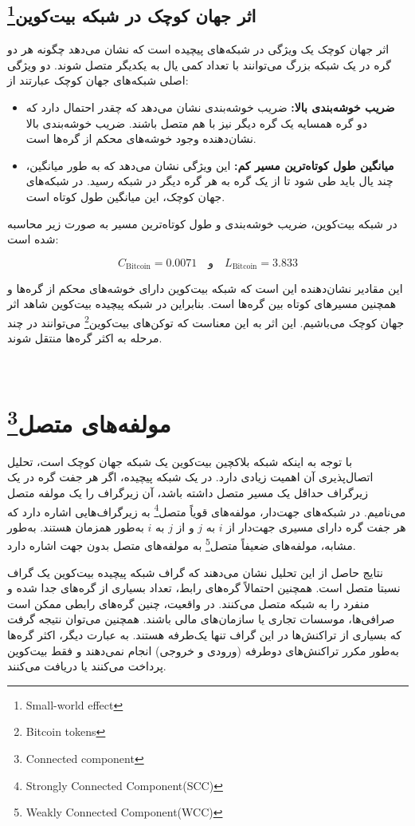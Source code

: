 \subsection{اثر جهان کوچک در شبکه بیت‌کوین\footnote{Small-world effect}}

اثر جهان کوچک یک ویژگی در شبکه‌های پیچیده است که نشان می‌دهد چگونه هر دو گره در یک شبکه بزرگ می‌توانند با تعداد کمی یال به یکدیگر متصل شوند. دو ویژگی اصلی شبکه‌های جهان کوچک عبارتند از:

\begin{itemize}
    \item \textbf{ضریب خوشه‌بندی بالا:} ضریب خوشه‌بندی نشان می‌دهد که چقدر احتمال دارد که دو گره همسایه یک گره دیگر نیز با هم متصل باشند. ضریب خوشه‌بندی بالا نشان‌دهنده وجود خوشه‌های محکم از گره‌ها است.
    \item \textbf{میانگین طول کوتاه‌ترین مسیر کم:} این ویژگی نشان می‌دهد که به طور میانگین، چند یال باید طی شود تا از یک گره به هر گره دیگر در شبکه رسید. در شبکه‌های جهان کوچک، این میانگین طول کوتاه است.
\end{itemize}

در شبکه بیت‌کوین، ضریب خوشه‌بندی و طول کوتاه‌ترین مسیر به صورت زیر محاسبه شده است:

\[
C_{\text{Bitcoin}} = 0.0071 \quad \text{و} \quad L_{\text{Bitcoin}} = 3.833
\]

این مقادیر نشان‌دهنده این است که شبکه بیت‌کوین دارای خوشه‌های محکم از گره‌ها و همچنین مسیرهای کوتاه بین گره‌ها است. بنابراین در شبکه پیچیده بیت‌کوین شاهد اثر جهان کوچک می‌باشیم. این اثر به این معناست که توکن‌های بیت‌کوین\footnote{Bitcoin tokens} می‌توانند در چند مرحله به اکثر گره‌ها منتقل شوند.

~\vfill
\section{مولفه‌های متصل\footnote{Connected component}}
با توجه به اینکه شبکه بلاکچین بیت‌کوین یک شبکه جهان کوچک است، تحلیل اتصال‌پذیری آن اهمیت زیادی دارد. در یک شبکه پیچیده، اگر هر جفت گره در یک زیرگراف حداقل یک مسیر متصل داشته باشد، آن زیرگراف را یک مولفه متصل می‌نامیم. در شبکه‌های جهت‌دار، مولفه‌های قویاً متصل\footnote{Strongly Connected Component(SCC)} به زیرگراف‌هایی اشاره دارد که هر جفت گره  دارای مسیری جهت‌دار از $i$ به $j$ و از $j$ به $i$ به‌طور همزمان هستند. به‌طور مشابه، مولفه‌های ضعیفاً متصل\footnote{Weakly Connected Component(WCC)} به مولفه‌های متصل بدون جهت اشاره دارد.

نتایج حاصل از این تحلیل نشان می‌دهند که گراف شبکه پیچیده بیت‌کوین یک گراف نسبتا متصل است. همچنین احتمالاً گره‌های رابط، تعداد بسیاری از گره‌های جدا شده و منفرد را به شبکه متصل می‌کنند. در واقعیت، چنین گره‌های رابطی ممکن است صرافی‌ها، موسسات تجاری یا سازمان‌های مالی باشند. همچنین می‌توان نتیجه گرفت که بسیاری از تراکنش‌ها در این گراف تنها یک‌طرفه هستند. به عبارت دیگر، اکثر گره‌ها به‌طور مکرر تراکنش‌های دوطرفه (ورودی و خروجی) انجام نمی‌دهند و فقط بیت‌کوین پرداخت می‌کنند یا دریافت می‌کنند.




